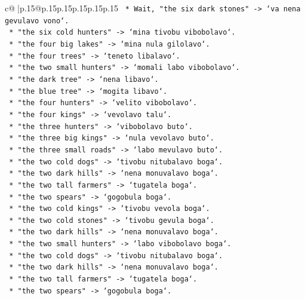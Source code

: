 \documentclass{article}
\begin{document}
{\begin{supertabular}{c@{$\;$}|p{.15\linewidth}@{}p{.15\linewidth}p{.15\linewidth}p{.15\linewidth}p{.15\linewidth}p{.15\linewidth}}
{{{\texttt{        *   Wait, "the six dark stones" {-}> `va nena gevulavo vono`.} \\
\texttt{        *   "the six cold hunters" {-}> `mina tivobu vibobolavo`.} \\
\texttt{        *   "the four big lakes" {-}> `mina nula gilolavo`.} \\
\texttt{        *   "the four trees" {-}> `teneto libalavo`.} \\
\texttt{        *   "the two small hunters" {-}> `momali labo vibobolavo`.} \\
\texttt{        *   "the dark tree" {-}> `nena libavo`.} \\
\texttt{        *   "the blue tree" {-}> `mogita libavo`.} \\
\texttt{        *   "the four hunters" {-}> `velito vibobolavo`.} \\
\texttt{        *   "the four kings" {-}> `vevolavo talu`.} \\
\texttt{        *   "the three hunters" {-}> `vibobolavo buto`.} \\
\texttt{        *   "the three big kings" {-}> `nula vevolavo buto`.} \\
\texttt{        *   "the three small roads" {-}> `labo mevulavo buto`.} \\
\texttt{        *   "the two cold dogs" {-}> `tivobu nitubalavo boga`.} \\
\texttt{        *   "the two dark hills" {-}> `nena monuvalavo boga`.} \\
\texttt{        *   "the two tall farmers" {-}> `tugatela boga`.} \\
\texttt{        *   "the two spears" {-}> `gogobula boga`.} \\
\texttt{        *   "the two cold kings" {-}> `tivobu vevola boga`.} \\
\texttt{        *   "the two cold stones" {-}> `tivobu gevula boga`.} \\
\texttt{        *   "the two dark hills" {-}> `nena monuvalavo boga`.} \\
\texttt{        *   "the two small hunters" {-}> `labo vibobolavo boga`.} \\
\texttt{        *   "the two cold dogs" {-}> `tivobu nitubalavo boga`.} \\
\texttt{        *   "the two dark hills" {-}> `nena monuvalavo boga`.} \\
\texttt{        *   "the two tall farmers" {-}> `tugatela boga`.} \\
\texttt{        *   "the two spears" {-}> `gogobula boga`.} \\
}}}
\end{supertabular}}
\end{document}
